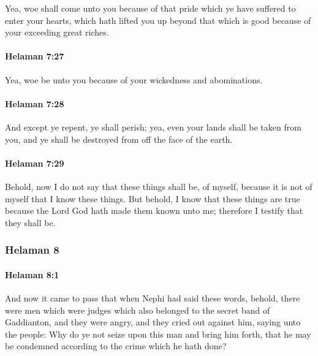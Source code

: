 			Yea, woe shall come unto you because of that pride
			which ye have suffered to enter your hearts,
			which hath lifted you up beyond that which is good
			because of your exceeding great riches.

		\paragraph{Helaman 7:27} %
			\label{HELAMAN-7-27}

			Yea, woe be unto you because of your wickedness and abominations.

		\paragraph{Helaman 7:28} %
			\label{HELAMAN-7-28}

			And except ye repent, ye shall perish;
			yea, even your lands shall be taken from you,
			and ye shall be destroyed from off the face of the earth.

		\paragraph{Helaman 7:29} %
			\label{HELAMAN-7-29}

			Behold, now I do not say that these things shall be, of myself,
			because it is not of myself that I know these things.
			But behold, I know that these things are true
			because the Lord God hath made them known unto me;
			therefore I testify that they shall be.

	\subsubsection{Helaman 8} %
		\label{HELAMAN-8}
		
		\paragraph{Helaman 8:1} %
			\label{HELAMAN-8-1}

			And now it came to pass that when Nephi had said these words,
			behold, there were men which were judges
			which also belonged to the secret band of Gaddianton,
			and they were angry,
			and they cried out against him, saying unto the people:
			Why do ye not seize upon this man and bring him forth,
			that he may be condemned according to the crime which he hath done?

